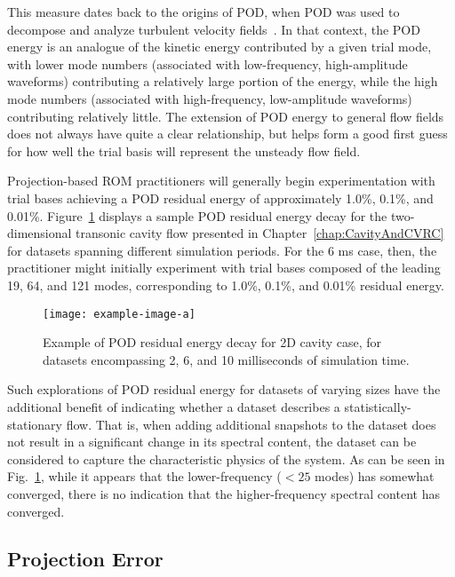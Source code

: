 This measure dates back to the origins of POD, when POD was used to decompose and analyze turbulent velocity fields~\cite{berkoozPOD}. In that context, the POD energy is an analogue of the kinetic energy contributed by a given trial mode, with lower mode numbers (associated with low-frequency, high-amplitude waveforms) contributing a relatively large portion of the energy, while the high mode numbers (associated with high-frequency, low-amplitude waveforms) contributing relatively little. The extension of POD energy to general flow fields does not always have quite a clear relationship, but helps form a good first guess for how well the trial basis will represent the unsteady flow field.

Projection-based ROM practitioners will generally begin experimentation with trial bases achieving a POD residual energy of approximately 1.0\%, 0.1\%, and 0.01\%. Figure~\ref{fig:samplePODEnergy} displays a sample POD residual energy decay for the two-dimensional transonic cavity flow presented in Chapter~\ref{chap:CavityAndCVRC} for datasets spanning different simulation periods. For the 6 ms case, then, the practitioner might initially experiment with trial bases composed of the leading 19, 64, and 121 modes, corresponding to 1.0\%, 0.1\%, and 0.01\% residual energy.

\begin{figure}
	\centering
	\texttt{[image: example-image-a]}
	\caption{\label{fig:samplePODEnergy}Example of POD residual energy decay for 2D cavity case, for datasets encompassing 2, 6, and 10 milliseconds of simulation time.}
\end{figure}

Such explorations of POD residual energy for datasets of varying sizes have the additional benefit of indicating whether a dataset describes a statistically-stationary flow. That is, when adding additional snapshots to the dataset does not result in a significant change in its spectral content, the dataset can be considered to capture the characteristic physics of the system. As can be seen in Fig.~\ref{fig:samplePODEnergy}, while it appears that the lower-frequency ($< 25$ modes) has somewhat converged, there is no indication that the higher-frequency spectral content has converged.

\subsection{Projection Error}\label{subsec:projError}


